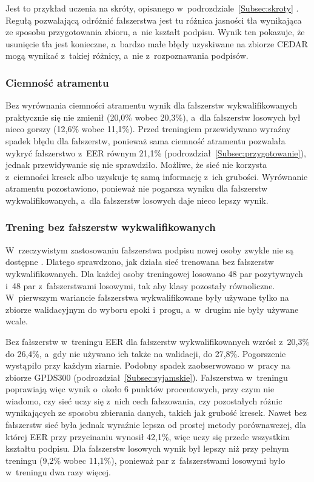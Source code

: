 \documentclass[12pt, twoside, openright]{article}
\begin{document}
Jest to przykład uczenia na skróty, opisanego w~podrozdziale~\ref{Subsec:skroty} \cite{geirhos2020}.
Regułą pozwalającą odróżnić fałszerstwa jest tu różnica jasności tła wynikająca ze sposobu przygotowania zbioru, a~nie kształt podpisu.
Wynik ten pokazuje, że usunięcie tła jest konieczne, a~bardzo małe błędy uzyskiwane na zbiorze CEDAR mogą wynikać z~takiej różnicy, a~nie z~rozpoznawania podpisów.

\subsubsection*{Ciemność atramentu}

Bez wyrównania ciemności atramentu wynik dla fałszerstw wykwalifikowanych praktycznie się nie zmienił (20,0\% wobec 20,3\%), a~dla fałszerstw losowych był nieco gorszy (12,6\% wobec 11,1\%).
Przed treningiem przewidywano wyraźny spadek błędu dla fałszerstw, ponieważ sama ciemność atramentu pozwalała wykryć fałszerstwo z~EER równym 21,1\% (podrozdział~\ref{Subsec:przygotowanie}), jednak przewidywanie się nie sprawdziło.
Możliwe, że sieć nie korzysta z~ciemności kresek albo uzyskuje tę samą informację z~ich grubości.
Wyrównanie atramentu pozostawiono, ponieważ nie pogarsza wyniku dla fałszerstw wykwalifikowanych, a~dla fałszerstw losowych daje nieco lepszy wynik.

\subsubsection*{Trening bez fałszerstw wykwalifikowanych}

W~rzeczywistym zastosowaniu fałszerstwa podpisu nowej osoby zwykle nie są dostępne \cite{hafemann2017review}.
Dlatego sprawdzono, jak działa sieć trenowana bez fałszerstw wykwalifikowanych.
Dla każdej osoby treningowej losowano 48 par pozytywnych i~48 par z~fałszerstwami losowymi, tak aby klasy pozostały równoliczne.
W~pierwszym wariancie fałszerstwa wykwalifikowane były używane tylko na zbiorze walidacyjnym do wyboru epoki i~progu, a~w~drugim nie były używane wcale.

Bez fałszerstw w~treningu EER dla fałszerstw wykwalifikowanych wzrósł z~20,3\% do 26,4\%, a~gdy nie używano ich także na walidacji, do 27,8\%.
Pogorszenie wystąpiło przy każdym ziarnie.
Podobny spadek zaobserwowano w~pracy \cite{dey2017} na zbiorze GPDS300 (podrozdział~\ref{Subsec:syjamskie}).
Fałszerstwa w~treningu poprawiają więc wynik o~około 6 punktów procentowych, przy czym nie wiadomo, czy sieć uczy się z~nich cech fałszowania, czy pozostałych różnic wynikających ze sposobu zbierania danych, takich jak grubość kresek.
Nawet bez fałszerstw sieć była jednak wyraźnie lepsza od prostej metody porównawczej, dla której EER przy przycinaniu wynosił 42,1\%, więc uczy się przede wszystkim kształtu podpisu.
Dla fałszerstw losowych wynik był lepszy niż przy pełnym treningu (9,2\% wobec 11,1\%), ponieważ par z~fałszerstwami losowymi było w~treningu dwa razy więcej.
\end{document}
